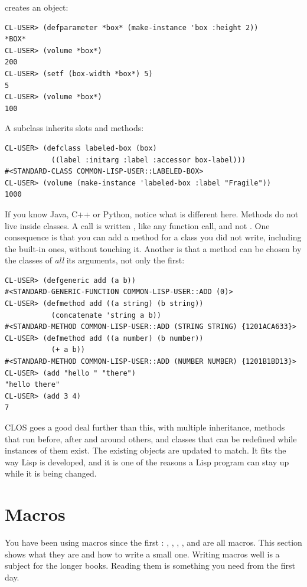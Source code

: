 \noindent
{} creates an object:

\begin{verbatim}
CL-USER> (defparameter *box* (make-instance 'box :height 2))
*BOX*
CL-USER> (volume *box*)
200
CL-USER> (setf (box-width *box*) 5)
5
CL-USER> (volume *box*)
100
\end{verbatim}

A subclass inherits slots and methods:

\begin{verbatim}
CL-USER> (defclass labeled-box (box)
           ((label :initarg :label :accessor box-label)))
#<STANDARD-CLASS COMMON-LISP-USER::LABELED-BOX>
CL-USER> (volume (make-instance 'labeled-box :label "Fragile"))
1000
\end{verbatim}

If you know Java, C++ or Python, notice what is different here.
Methods do not live inside classes. A call is written
, like any function call, and not
. One consequence is that you can add a method for
a class you did not write, including the built-in ones, without
touching it. Another is that a method can be chosen by the classes of
\emph{all} its arguments, not only the first:

\begin{verbatim}
CL-USER> (defgeneric add (a b))
#<STANDARD-GENERIC-FUNCTION COMMON-LISP-USER::ADD (0)>
CL-USER> (defmethod add ((a string) (b string))
           (concatenate 'string a b))
#<STANDARD-METHOD COMMON-LISP-USER::ADD (STRING STRING) {1201ACA633}>
CL-USER> (defmethod add ((a number) (b number))
           (+ a b))
#<STANDARD-METHOD COMMON-LISP-USER::ADD (NUMBER NUMBER) {1201B1BD13}>
CL-USER> (add "hello " "there")
"hello there"
CL-USER> (add 3 4)
7
\end{verbatim}

CLOS goes a good deal further than this, with multiple inheritance,
methods that run before, after and around others, and classes that can
be redefined while instances of them exist. The existing objects are
updated to match. It fits the way Lisp is developed, and it is one of
the reasons a Lisp program can stay up while it is being changed.

\section{Macros}
\label{sec:macros}

You have been using macros since the first :
, , , ,  and
 are all macros. This section shows what they
are and how to write a small one. Writing macros well is a subject
for the longer books. Reading them is something you need from the
first day.

